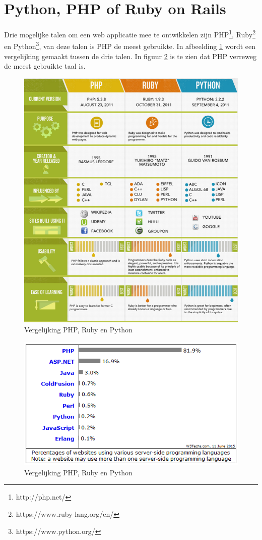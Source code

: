 \documentclass[twoside,openright]{uva-bachelor-thesis}
\begin{document}
		\section{Python, PHP of Ruby on Rails}
			Drie mogelijke talen om een web applicatie mee te ontwikkelen zijn PHP\footnote{http://php.net/}, Ruby\footnote{https://www.ruby-lang.org/en/} en Python\footnote{https://www.python.org/}, van deze talen is PHP de meest gebruikte. In afbeelding \ref{fig:phpvspython} wordt een vergelijking gemaakt tussen de drie talen. In figuur \ref{fig:phpvspython3} is te zien dat PHP verreweg de meest gebruikte taal is.
			\begin{figure}[!htb]
				\centering
				\includegraphics[scale=0.9]{./img/phpvspython.png}
				\caption{Vergelijking PHP, Ruby en Python}
				\label{fig:phpvspython}
			\end{figure} 
			\begin{figure}[!htb]
				\centering
				\includegraphics[scale=0.9]{./img/phpvspython3.png}
				\caption{Vergelijking PHP, Ruby en Python}
				\label{fig:phpvspython3}
			\end{figure} 
\end{document}
